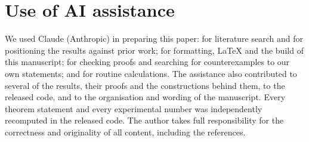 \section{Use of AI assistance}\label{app:ai}

We used Claude (Anthropic) in preparing this paper: for literature search and for positioning the
results against prior work; for formatting, \LaTeX{} and the build of this manuscript; for
checking proofs and searching for counterexamples to our own statements; and for routine
calculations. The assistance also contributed to several of the results, their
proofs and the constructions behind them, to the released code, and to the organisation and
wording of the manuscript. Every theorem statement and every experimental number was independently
recomputed in the released code. The author takes full responsibility for the correctness and
originality of all content, including the references.
